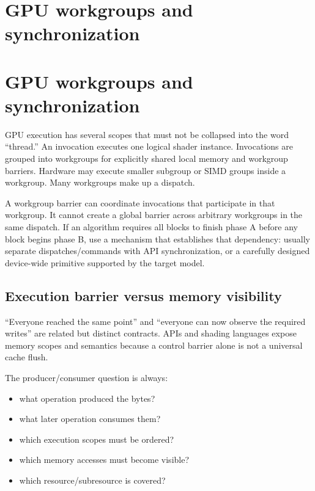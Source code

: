 \hypertarget{appendix-f662b5b1773b}{}
\section*{GPU workgroups and synchronization}
\section{GPU workgroups and synchronization}\label{gpu-workgroups-and-synchronization}

GPU execution has several scopes that must not be collapsed into the word ``thread.'' An invocation executes one logical shader instance. Invocations are grouped into workgroups for explicitly shared local memory and workgroup barriers. Hardware may execute smaller subgroup or SIMD groups inside a workgroup. Many workgroups make up a dispatch.

A workgroup barrier can coordinate invocations that participate in that workgroup. It cannot create a global barrier across arbitrary workgroups in the same dispatch. If an algorithm requires all blocks to finish phase A before any block begins phase B, use a mechanism that establishes that dependency: usually separate dispatches/commands with API synchronization, or a carefully designed device-wide primitive supported by the target model.

\subsection{Execution barrier versus memory visibility}\label{execution-barrier-versus-memory-visibility}

``Everyone reached the same point'' and ``everyone can now observe the required writes'' are related but distinct contracts. APIs and shading languages expose memory scopes and semantics because a control barrier alone is not a universal cache flush.

The producer/consumer question is always:

\begin{itemize}
\tightlist
\item
  what operation produced the bytes?
\item
  what later operation consumes them?
\item
  which execution scopes must be ordered?
\item
  which memory accesses must become visible?
\item
  which resource/subresource is covered?
\end{itemize}

